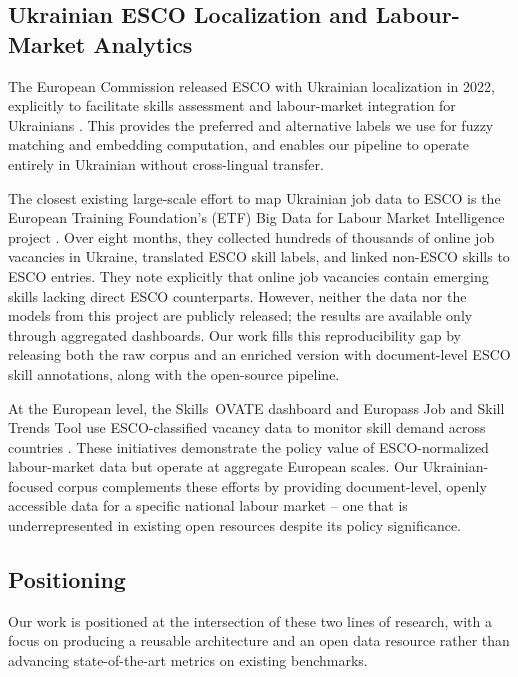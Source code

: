 \documentclass[11pt]{article}
\begin{document}
\subsection{Ukrainian ESCO Localization and Labour-Market Analytics}
\label{sec:related-ukraine}

The European Commission released ESCO with Ukrainian localization in 2022, explicitly to facilitate skills assessment and labour-market integration for Ukrainians \citep{EuroComission2022}. This provides the preferred and alternative labels we use for fuzzy matching and embedding computation, and enables our pipeline to operate entirely in Ukrainian without cross-lingual transfer.

The closest existing large-scale effort to map Ukrainian job data to ESCO is the European Training Foundation's (ETF) Big Data for Labour Market Intelligence project \citep{Sarioglo2020}. Over eight months, they collected hundreds of thousands of online job vacancies in Ukraine, translated ESCO skill labels, and linked non-ESCO skills to ESCO entries. They note explicitly that online job vacancies contain emerging skills lacking direct ESCO counterparts. However, neither the data nor the models from this project are publicly released; the results are available only through aggregated dashboards. Our work fills this reproducibility gap by releasing both the raw corpus and an enriched version with document-level ESCO skill annotations, along with the open-source pipeline.

At the European level, the Skills~OVATE dashboard and Europass Job and Skill Trends Tool use ESCO-classified vacancy data to monitor skill demand across countries \citep{skills-ovate}.  These initiatives demonstrate the policy value of ESCO-normalized labour-market data but operate at aggregate European scales. Our Ukrainian-focused corpus complements these efforts by providing document-level, openly accessible data for a specific national labour market -- one that is underrepresented in existing open resources despite its policy significance.

\subsection{Positioning}
\label{sec:related-positioning}

Our work is positioned at the intersection of these two lines of research, with a focus on producing a reusable architecture and an open data resource rather than advancing state-of-the-art metrics on existing benchmarks.
\end{document}
